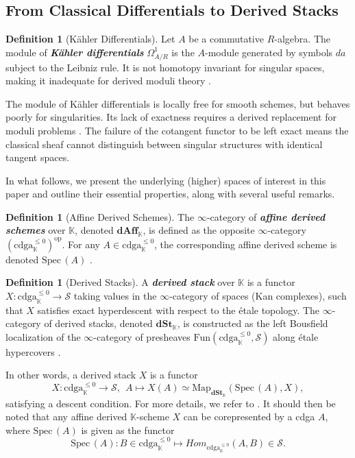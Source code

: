 \documentclass[reqno]{amsart}
\theoremstyle{definition}
\newtheorem{definition}[theorem]{Definition}
\theoremstyle{remark}
\newcommand{\K}{\mathbb{K}}
\newcommand{\Spec}{\mathrm{Spec\,}}
\newcommand{\bfem}[1]{\textbf{\textit{#1}}}
\begin{document}
\subsection{From Classical Differentials to Derived Stacks} \label{sec:diffs}

\begin{definition}[K\"{a}hler Differentials]
  Let $A$ be a commutative $R$-algebra. The module of
  \bfem{K\"{a}hler differentials} $\Omega^1_{A/R}$ is the
  $A$-module generated by symbols $da$ subject to the
  Leibniz rule. It is not homotopy invariant for singular spaces,
  making it inadequate for
  derived moduli theory \cite[Section 1.3.1]{CPTVV}.
\end{definition}

The module of K\"{a}hler differentials is locally free for
smooth schemes, but behaves poorly for singularities.
Its lack of exactness requires a derived replacement for moduli
problems \cite[Section 1.1]{Calaque}. The
failure of the cotangent functor to be left exact means the
classical sheaf cannot distinguish between singular
structures with identical tangent spaces.

In what follows, we present the underlying (higher) spaces of interest in this paper and outline their essential properties, along with several useful remarks.

\begin{definition}[Affine Derived Schemes]
  The $\infty$-category of \bfem{affine derived schemes} over $\K$,
  denoted $\mathbf{dAff}_\K$, is defined as the opposite
  $\infty$-category $(\mathrm{cdga}_\K^{\leq 0})^{\mathrm{op}}$. For
  any $A \in \mathrm{cdga}_\K^{\leq 0}$, the corresponding affine
  derived scheme is denoted $\Spec(A)$ \cite[Definition 2.2.2.4]{HAG-II}.
\end{definition}

\begin{definition}[Derived Stacks]
  A \bfem{derived stack} over $\K$ is a functor $X \colon
  \mathrm{cdga}_\K^{\leq 0} \to \mathcal{S}$ taking values in the
  $\infty$-category of spaces (Kan complexes), such that $X$
  satisfies exact hyperdescent with respect to the \'{e}tale
  topology. The $\infty$-category of derived stacks, denoted
  $\mathbf{dSt}_\K$, is constructed as the left Bousfield
  localization of the $\infty$-category of presheaves
  $\mathrm{Fun}(\mathrm{cdga}_\K^{\leq 0}, \mathcal{S})$ along
  \'{e}tale hypercovers \cite[Definition 2.2.2.14]{HAG-II}.
\end{definition}
In other words, a derived stack $ {X} $ is  a  functor  $$ {X}:  \mathrm{cdga}_{\K}^{\leq 0} \rightarrow  \mathcal{S}, \ \ A\mapsto X(A) \simeq \mathrm{Map}_{\mathbf{dSt}_\K}(\Spec(A), {X}),$$ satisfying a descent condition.
For more details, we refer to \cite{HAG-II}. 
It should then be noted that any affine derived $\mathbb{K}$-scheme $X$ can be corepresented by a cdga $A$, where $\Spec(A)$ is given as the functor \[ \Spec (A): B\in \mathrm{cdga}_\K^{\leq 0}  \longmapsto Hom_{\mathrm{cdga}_{\mathbb{K}}^{\leq 0}} (A,B) \in \mathcal{S}.\]
\end{document}
